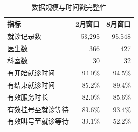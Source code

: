 \begin{table}[H]
  \centering
  \caption{数据规模与时间戳完整性}
  \label{tab:data-quality}
  \begin{tabular}{lrr}
    \toprule
    指标 & 2月窗口 & 8月窗口 \\
    \midrule
    就诊记录数 & 58,295 & 95,548 \\
    医生数 & 366 & 427 \\
    科室数 & 30 & 32 \\
    有开始就诊时间 & 90.0\% & 94.5\% \\
    有结束就诊时间 & 85.2\% & 89.4\% \\
    有效服务时长 & 82.0\% & 85.6\% \\
    有效挂号至就诊等待 & 89.6\% & 93.4\% \\
    有效叫号至就诊等待 & 39.1\% & 52.2\% \\
    \bottomrule
  \end{tabular}
\end{table}
